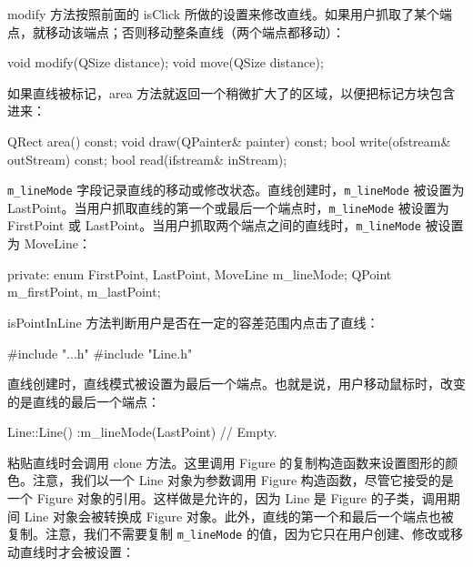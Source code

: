 modify 方法按照前面的 isClick 所做的设置来修改直线。如果用户抓取了某个端点，就移动该端点；否则移动整条直线（两个端点都移动）：

\begin{codebox}
  void modify(QSize distance);
  void move(QSize distance);
\end{codebox}

如果直线被标记，area 方法就返回一个稍微扩大了的区域，以便把标记方块包含进来：

\begin{codebox}
  QRect area() const;
  void draw(QPainter& painter) const;
  bool write(ofstream& outStream) const;
  bool read(ifstream& inStream);
\end{codebox}

\texttt{m\_lineMode} 字段记录直线的移动或修改状态。直线创建时，\texttt{m\_lineMode} 被设置为 LastPoint。当用户抓取直线的第一个或最后一个端点时，\texttt{m\_lineMode} 被设置为 FirstPoint 或 LastPoint。当用户抓取两个端点之间的直线时，\texttt{m\_lineMode} 被设置为 MoveLine：

\begin{codebox}
  private:
       enum {FirstPoint, LastPoint, MoveLine} m_lineMode;
       QPoint m_firstPoint, m_lastPoint;
\end{codebox}

isPointInLine 方法判断用户是否在一定的容差范围内点击了直线：

\begin{codebox}
  static bool isPointInLine(QPoint m_firstPoint,
                            QPoint m_lastPoint, QPoint point);
};

#endif
\end{codebox}

\medskip{}

\begin{codebox}
#include "..\MainWindow\DocumentWidget.h"
#include "Line.h"
\end{codebox}

直线创建时，直线模式被设置为最后一个端点。也就是说，用户移动鼠标时，改变的是直线的最后一个端点：

\begin{codebox}
Line::Line()
:m_lineMode(LastPoint) {
  // Empty.
}
\end{codebox}

粘贴直线时会调用 clone 方法。这里调用 Figure 的复制构造函数来设置图形的颜色。注意，我们以一个 Line 对象为参数调用 Figure 构造函数，尽管它接受的是一个 Figure 对象的引用。这样做是允许的，因为 Line 是 Figure 的子类，调用期间 Line 对象会被转换成 Figure 对象。此外，直线的第一个和最后一个端点也被复制。注意，我们不需要复制 \texttt{m\_lineMode} 的值，因为它只在用户创建、修改或移动直线时才会被设置：

